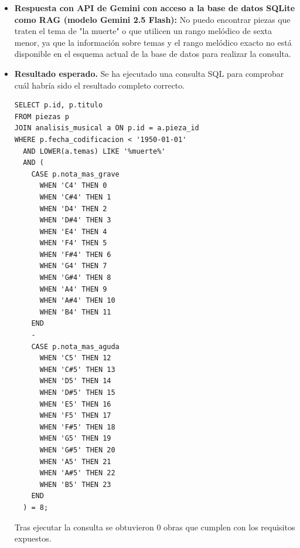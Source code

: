 \begin{itemize}
Por último, también encontré la pieza ""La muerte del artista"" (Der Tod des Künstlers) - Un lied para voz y piano de Alban Berg (1914), basado en el poema homónimo de Georg Trakl."
\item \textbf{Respuesta con API de Gemini con acceso a la base de datos SQLite como RAG (modelo Gemini 2.5 Flash):} No puedo encontrar piezas que traten el tema de "la muerte" o que utilicen un rango melódico de sexta menor, ya que la información sobre temas y el rango melódico exacto no está disponible en el esquema actual de la base de datos para realizar la consulta.
    \item \textbf{Resultado esperado.} Se ha ejecutado una consulta SQL para comprobar cuál habría sido el resultado completo correcto.
    \begin{verbatim}
SELECT p.id, p.titulo
FROM piezas p
JOIN analisis_musical a ON p.id = a.pieza_id
WHERE p.fecha_codificacion < '1950-01-01'
  AND LOWER(a.temas) LIKE '%muerte%'
  AND (
    CASE p.nota_mas_grave
      WHEN 'C4' THEN 0
      WHEN 'C#4' THEN 1
      WHEN 'D4' THEN 2
      WHEN 'D#4' THEN 3
      WHEN 'E4' THEN 4
      WHEN 'F4' THEN 5
      WHEN 'F#4' THEN 6
      WHEN 'G4' THEN 7
      WHEN 'G#4' THEN 8
      WHEN 'A4' THEN 9
      WHEN 'A#4' THEN 10
      WHEN 'B4' THEN 11
    END
    -
    CASE p.nota_mas_aguda
      WHEN 'C5' THEN 12
      WHEN 'C#5' THEN 13
      WHEN 'D5' THEN 14
      WHEN 'D#5' THEN 15
      WHEN 'E5' THEN 16
      WHEN 'F5' THEN 17
      WHEN 'F#5' THEN 18
      WHEN 'G5' THEN 19
      WHEN 'G#5' THEN 20
      WHEN 'A5' THEN 21
      WHEN 'A#5' THEN 22
      WHEN 'B5' THEN 23
    END
  ) = 8;
    \end{verbatim}    
    Tras ejecutar la consulta se obtuvieron 0 obras que cumplen con los requisitos expuestos.



\end{itemize}
